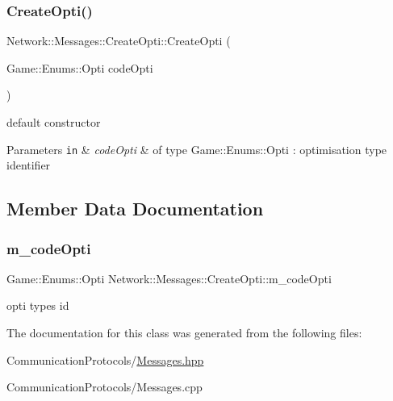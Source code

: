 \subsubsection{\texorpdfstring{Create\+Opti()}{CreateOpti()}}
{\footnotesize\ttfamily Network\+::\+Messages\+::\+Create\+Opti\+::\+Create\+Opti (\begin{DoxyParamCaption}\item[{Game\+::\+Enums\+::\+Opti}]{code\+Opti }\end{DoxyParamCaption})\hspace{0.3cm}{\ttfamily [inline]}}



default constructor 


\begin{DoxyParams}[1]{Parameters}
\mbox{\tt in}  & {\em code\+Opti} & of type Game\+::\+Enums\+::\+Opti \+: optimisation type identifier \\
\hline
\end{DoxyParams}


\subsection{Member Data Documentation}
\mbox{\label{class_network_1_1_messages_1_1_create_opti_af20bfa22b5eaa162f9b9e129637b4768}} 
\subsubsection{\texorpdfstring{m\+\_\+code\+Opti}{m\_codeOpti}}
{\footnotesize\ttfamily Game\+::\+Enums\+::\+Opti Network\+::\+Messages\+::\+Create\+Opti\+::m\+\_\+code\+Opti}

opti type\textquotesingle{}s id 

The documentation for this class was generated from the following files\+:\begin{DoxyCompactItemize}
\item 
Communication\+Protocols/\hyperlink{_messages_8hpp}{Messages.\+hpp}\item 
Communication\+Protocols/Messages.\+cpp\end{DoxyCompactItemize}
